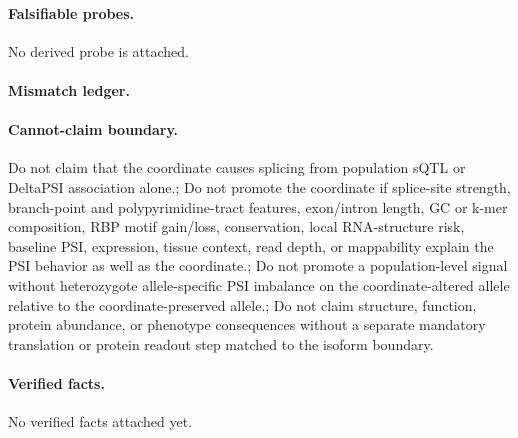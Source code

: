 \paragraph{Falsifiable probes.}
No derived probe is attached.

\paragraph{Mismatch ledger.}
\paragraph{Cannot-claim boundary.} Do not claim that the coordinate causes splicing from population sQTL or DeltaPSI association alone.; Do not promote the coordinate if splice-site strength, branch-point and polypyrimidine-tract features, exon/intron length, GC or k-mer composition, RBP motif gain/loss, conservation, local RNA-structure risk, baseline PSI, expression, tissue context, read depth, or mappability explain the PSI behavior as well as the coordinate.; Do not promote a population-level signal without heterozygote allele-specific PSI imbalance on the coordinate-altered allele relative to the coordinate-preserved allele.; Do not claim structure, function, protein abundance, or phenotype consequences without a separate mandatory translation or protein readout step matched to the isoform boundary.

\paragraph{Verified facts.}
No verified facts attached yet.
